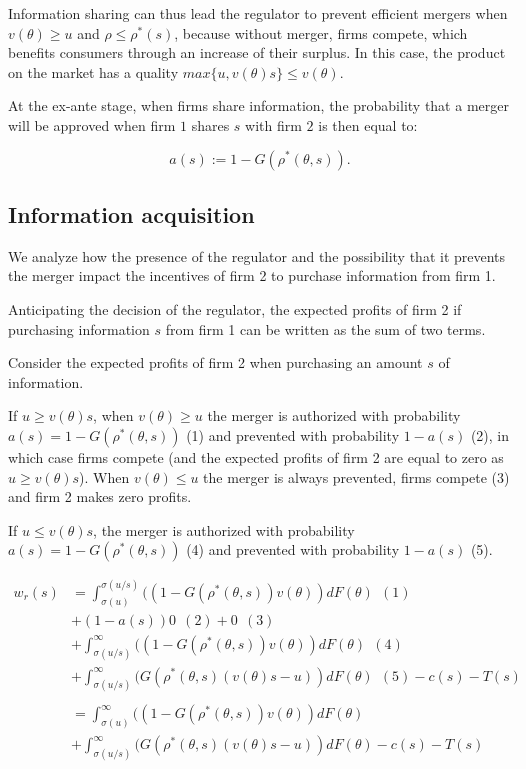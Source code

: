 \documentclass[a4paper,leqno]{article}%
\renewcommand{\t}{\theta}
\newcommand{\s}{\sigma}
\begin{document}
Information sharing can thus lead the regulator to prevent efficient mergers when $v(\t)\geq u$ and $\rho \leq \rho^*(s)$, because without merger, firms compete, which benefits consumers through an increase of their surplus. In this case, the product on the market has a quality $max\{u,v(\t)s\}\leq v(\t)$.

At the ex-ante stage, when firms share information, the probability that a merger will be approved when firm $1$ shares $s$ with firm $2$ is then equal to:

\[
a(s):=1-G(\rho^*(\t,s)).
\]


\subsection{Information acquisition}

We analyze how the presence of the regulator and the possibility that it prevents the merger impact the incentives of firm 2 to purchase information from firm 1.

Anticipating the decision of the regulator, the expected profits of firm 2 if purchasing information $s$ from firm 1 can be written as the sum of two terms. 


Consider the expected profits of firm 2 when purchasing an amount $s$ of information.

If $u\geq v(\t)s$, when $v(\t)\geq u$ the merger is authorized with probability $a(s)=1-G(\rho^*(\t,s))$ (1) and prevented with probability $1-a(s)$ (2), in which case firms compete (and the expected profits of firm 2 are equal to zero as $u\geq v(\t)s$). When $v(\t)\leq u$ the merger is always prevented, firms compete (3) and firm 2 makes zero profits.

If $u\leq v(\t)s$, the merger is authorized with probability $a(s)=1-G(\rho^*(\t,s))$ (4) and prevented with probability $1-a(s)$ (5). 


\begin{equation}
    \begin{aligned}
w_r(s)&=\int_{\s(u)}^{\s(u/s)}((1-G(\rho^*(\t,s))v(\t))dF(\t)~~(1)\\ 
    &+(1-a(s))0~~(2)+0~~(3)\\
    &+\int_{\s(u/s)}^{\infty}((1-G(\rho^*(\t,s))v(\t))dF(\t)~~(4)\\
    &+\int_{\s(u/s)}^\infty (G(\rho^*(\t,s)(v(\t)s-u))dF(\t)~~(5)-c(s)-T(s)\\
    &\\
    &=\int_{\s(u)}^{\infty}((1-G(\rho^*(\t,s))v(\t))dF(\t)\\
    &+\int_{\s(u/s)}^\infty (G(\rho^*(\t,s)(v(\t)s-u))dF(\t)-c(s)-T(s)\\
\end{aligned}
\end{equation}
\end{document}
